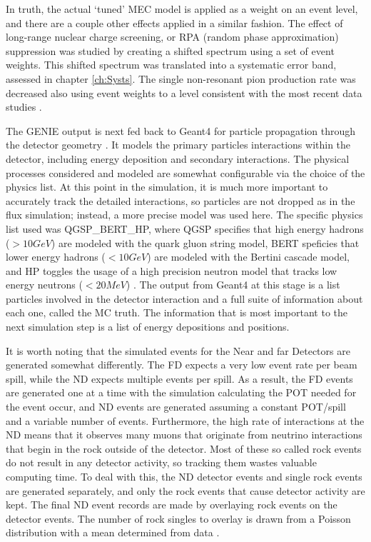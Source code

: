 In truth, the actual `tuned' MEC model is applied as a weight on an event level, and there are a couple other effects applied in a similar fashion. The effect of long-range nuclear charge screening, or RPA (random phase approximation) suppression was studied by creating a shifted spectrum using a set of event weights. This shifted spectrum was translated into a systematic error band, assessed in chapter \ref{ch:Systs}. The single non-resonant pion production rate was decreased also using event weights to a level consistent with the most recent data studies \cite{ref:TNGENIE}.

The GENIE output is next fed back to Geant4 for particle propagation through the detector geometry \cite{ref:Geant41, ref:Geant42}. It models the primary particles interactions within the detector, including energy deposition and secondary interactions. The physical processes considered and modeled are somewhat configurable via the choice of the physics list. At this point in the simulation, it is much more important to accurately track the detailed interactions, so particles are not dropped as in the flux simulation; instead, a more precise model was used here. The specific physics list used was QGSP\_BERT\_HP, where QGSP specifies that high energy hadrons ($> 10\unit{GeV}$) are modeled with the quark gluon string model, BERT speficies that lower energy hadrons ($< 10\unit{GeV}$) are modeled with the Bertini cascade model, and HP toggles the usage of a high precision neutron model that tracks low energy neutrons ($< 20\unit{MeV}$) \cite{ref:TNDetSim}. The output from Geant4 at this stage is a list particles involved in the detector interaction and a full suite of information about each one, called the MC truth. The information that is most important to the next simulation step is a list of energy depositions and positions.

It is worth noting that the simulated events for the Near and far Detectors are generated somewhat differently. The FD expects a very low event rate per beam spill, while the ND expects multiple events per spill. As a result, the FD events are generated one at a time with the simulation calculating the POT needed for the event occur, and ND events are generated assuming a constant POT/spill and a variable number of events. Furthermore, the high rate of interactions at the ND means that it observes many muons that originate from neutrino interactions that begin in the rock outside of the detector. Most of these so called rock events do not result in any detector activity, so tracking them wastes valuable computing time. To deal with this, the ND detector events and single rock events are generated separately, and only the rock events that cause detector activity are kept. The final ND event records are made by overlaying rock events on the detector events. The number of rock singles to overlay is drawn from a Poisson distribution with a mean determined from data \cite{ref:SimRock}.

